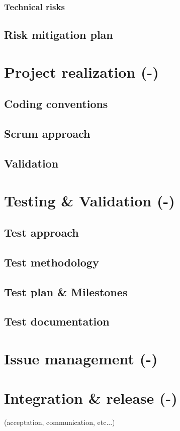 \documentclass[a4paper,12pt,abstracton,titlepage]{scrartcl}
\begin{document}
\subsubsection{Technical risks}
\subsection{Risk mitigation plan}

\section{Project realization (-)}
\label{sec:project-realization}
\subsection{Coding conventions}
\subsection{Scrum approach}
\subsection{Validation}

\section{Testing \& Validation (-)}
\label{sec:testing-validation}
\subsection{Test approach}
\subsection{Test methodology}
\subsection{Test plan \& Milestones}
\subsection{Test documentation}

\section{Issue management (-)}
\label{sec:issue-management}

\section{Integration \& release (-)}
\label{sec:integration-release}
(acceptation, communication, etc...)
\end{document}

